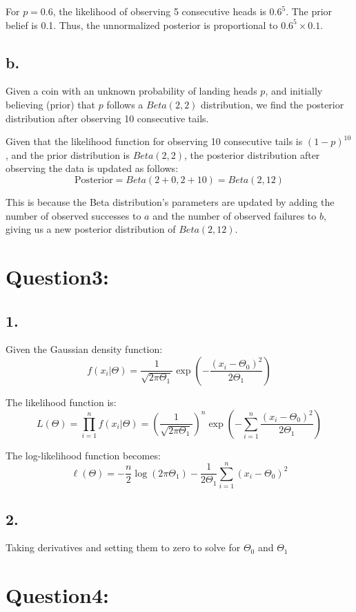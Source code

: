 \documentclass{article}
\begin{document}
For \(p=0.6\), the likelihood of observing 5 consecutive heads is \(0.6^5\). The prior belief is 0.1. Thus, the unnormalized posterior is proportional to \(0.6^5 \times 0.1\).

\subsection*{b.}

Given a coin with an unknown probability of landing heads \(p\), and initially believing (prior) that \(p\) follows a \(Beta(2, 2)\) distribution, we find the posterior distribution after observing 10 consecutive tails.

Given that the likelihood function for observing 10 consecutive tails is \((1-p)^{10}\), and the prior distribution is \(Beta(2, 2)\), the posterior distribution after observing the data is updated as follows:
\[ \text{Posterior} = Beta(2+0, 2+10) = Beta(2, 12) \]

This is because the Beta distribution's parameters are updated by adding the number of observed successes to \(a\) and the number of observed failures to \(b\), giving us a new posterior distribution of \(Beta(2, 12)\).

\section*{Question3:}
\subsection*{1.}
Given the Gaussian density function:
\[ f(x_i|\Theta) = \frac{1}{\sqrt{2\pi\Theta_1}} \exp\left(-\frac{(x_i - \Theta_0)^2}{2\Theta_1}\right) \]

The likelihood function is:
\[ L(\Theta) = \prod_{i=1}^{n} f(x_i|\Theta) = \left(\frac{1}{\sqrt{2\pi\Theta_1}}\right)^n \exp\left(-\sum_{i=1}^{n}\frac{(x_i - \Theta_0)^2}{2\Theta_1}\right) \]

The log-likelihood function becomes:
\[ \ell(\Theta) = -\frac{n}{2}\log(2\pi\Theta_1) - \frac{1}{2\Theta_1}\sum_{i=1}^{n}(x_i - \Theta_0)^2 \]
\subsection*{2.}
Taking derivatives and setting them to zero to solve for $\Theta_0$ and $\Theta_1$

\section*{Question4:}
\end{document}
